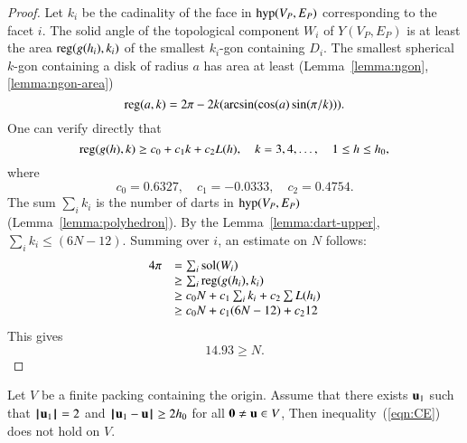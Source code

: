 \begin{proof}
Let $k_i$ be the cadinality of the face in ${\operatorname{hyp}}(V_P,E_P)$ corresponding to the facet $i$.   The solid angle of the topological component $W_i$ of $Y(V_P,E_P)$ is 
at least the area ${\operatorname{reg}}(g(h_i),k_i)$ of the smallest $k_i$-gon containing $D_i$.  The smallest spherical $k$-gon containing a disk of radius $a$ has area at least (Lemma~\ref{lemma:ngon}, \ref{lemma:ngon-area})
%
%
%
$$
{\operatorname{reg}}(a,k) = 2\pi - 2 k (\arcsin(\cos(a)\sin(\pi/k))).
$$
One can verify directly that~\cite[]{hales:2009:nonlinear} %
$$
{\operatorname{reg}}(g(h),k) \ge c_0 + c_1 k + c_2 L(h),\quad
k = 3,4,\ldots,\quad 1\le h\le {h_0},
$$
where
$$c_0 = 0.6327,\quad c_1 = -0.0333,\quad c_2 = 0.4754.$$
The sum $\sum_i k_i$ is the number of darts in ${\operatorname{hyp}}(V_P,E_P)$ (Lemma~\ref{lemma:polyhedron}).  By the Lemma~\ref{lemma:dart-upper}, 
$\sum_i k_i \le (6N-12)$.
Summing over $i$,  an estimate on $N$ follows:
%
%
$$
\begin{array}{lll}
4\pi &= \sum_i{\operatorname{sol}}(W_i)\\
     &\ge \sum_i {\operatorname{reg}}(g(h_i),k_i) \\
     &\ge c_0 N +c_1\sum_i k_i + c_2 \sum L(h_i)\\
     &\ge c_0 N +c_1 (6N-12) + c_2 12\\
\end{array}
$$
This gives
$$
14.93 \ge N.
$$
\end{proof} 


\begin{lemma}\label{300}\label{lemma:D'}  
Let $ V$ be a finite packing containing the origin.
Assume that there exists $ {\mathbf u}_1$ such that ${{\hskip0.1em|\hskip-0.15em|\hskip0.1em} {\mathbf u}_1{\hskip0.1em|\hskip-0.15em|\hskip0.1em}}=2$ and
${\hskip0.1em|\hskip-0.15em|\hskip0.1em} {\mathbf u}_1 -  {\mathbf u}{\hskip0.1em|\hskip-0.15em|\hskip0.1em}\ge 2{h_0}$ for all ${\mathbf 0}\ne {\mathbf u}\in V$,
Then  inequality~(\ref{eqn:CE}) does not hold on $ V$.
\end{lemma}


